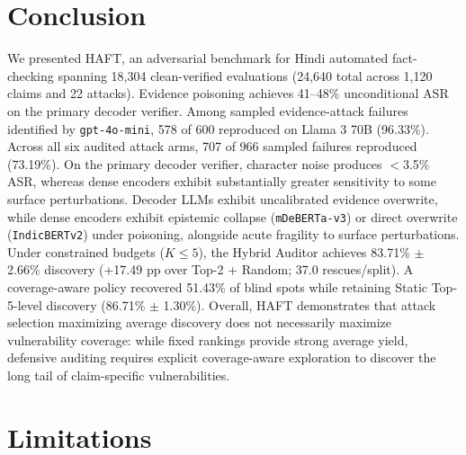 \documentclass[11pt]{article}
\begin{document}
\section{Conclusion}
\label{sec:conclusion}
We presented HAFT, an adversarial benchmark for Hindi automated fact-checking spanning 18,304 clean-verified evaluations (24,640 total across 1,120 claims and 22 attacks). Evidence poisoning achieves 41--48\% unconditional ASR on the primary decoder verifier. Among sampled evidence-attack failures identified by \texttt{gpt-4o-mini}, 578 of 600 reproduced on Llama 3 70B (96.33\%). Across all six audited attack arms, 707 of 966 sampled failures reproduced (73.19\%). On the primary decoder verifier, character noise produces $<$3.5\% ASR, whereas dense encoders exhibit substantially greater sensitivity to some surface perturbations. Decoder LLMs exhibit uncalibrated evidence overwrite, while dense encoders exhibit epistemic collapse (\texttt{mDeBERTa-v3}) or direct overwrite (\texttt{IndicBERTv2}) under poisoning, alongside acute fragility to surface perturbations. Under constrained budgets ($K \le 5$), the Hybrid Auditor achieves 83.71\% $\pm$ 2.66\% discovery (+17.49 pp over Top-2 + Random; 37.0 rescues/split). A coverage-aware policy recovered 51.43\% of blind spots while retaining Static Top-5-level discovery (86.71\% $\pm$ 1.30\%). Overall, HAFT demonstrates that attack selection maximizing average discovery does not necessarily maximize vulnerability coverage: while fixed rankings provide strong average yield, defensive auditing requires explicit coverage-aware exploration to discover the long tail of claim-specific vulnerabilities.

\section*{Limitations}
\label{sec:limitations}
\end{document}
